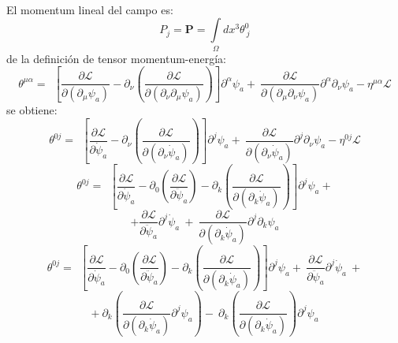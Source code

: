 \documentclass[a4paper,12pt]{article}
\begin{document}
\\

El momentum lineal del campo es:
\begin{equation}
P_{j}=\mathbf{P}=\int\limits_{\Omega}dx^{3}\theta^{0}_{\ j}
\end{equation}
de la definición de tensor momentum-energía:
\begin{equation}
\theta^{\mu\alpha}= \ \ \left[\frac{\partial \mathscr{L} }{\partial(\partial_{\mu} \psi_a)}-\partial_{\nu}\left(\frac{\partial\mathscr{L} }{\partial(\partial_{\nu}\partial_{\mu} \psi_a)}  \right) \right]\partial^\alpha\psi_a +\ \frac{\partial\mathscr{L} }{\partial(\partial_{\mu}\partial_{\nu} \psi_a)}\partial^\alpha\partial_\nu\psi_a-\eta^{\mu\alpha}\mathscr{L}
\end{equation}
se obtiene:
\begin{equation}
\theta^{0j}= \ \ \left[\frac{\partial \mathscr{L} }{\partial\dot\psi_a}-\partial_{\nu}\left(\frac{\partial\mathscr{L} }{\partial(\partial_{\nu}\dot\psi_a)}  \right) \right]\partial^j\psi_a +\ \frac{\partial\mathscr{L} }{\partial(\partial_{\nu} \dot\psi_a)}\partial^j\partial_\nu\psi_a-\eta^{0j}\mathscr{L}
\end{equation}
\begin{equation}
\theta^{0j}= \ \ \left[\frac{\partial \mathscr{L} }{\partial\dot\psi_a}-\partial_{0}\left(\frac{\partial\mathscr{L} }{\partial\ddot\psi_a}  \right)-\partial_{k}\left(\frac{\partial\mathscr{L} }{\partial(\partial_{k}\dot\psi_a)}  \right) \right]\partial^j\psi_a +
\end{equation}
$$+ \frac{\partial\mathscr{L} }{\partial\ddot\psi_a}\partial^j\dot\psi_a\ +\ \frac{\partial\mathscr{L} }{\partial(\partial_k\dot\psi_a)}\partial^j\partial_k\psi_a$$
\begin{equation}
\theta^{0j}= \ \ \left[\frac{\partial \mathscr{L} }{\partial\dot\psi_a}-\partial_{0}\left(\frac{\partial\mathscr{L} }{\partial\ddot\psi_a}  \right)-\partial_{k}\left(\frac{\partial\mathscr{L} }{\partial(\partial_{k}\dot\psi_a)}  \right) \right]\partial^j\psi_a +\ \frac{\partial\mathscr{L} }{\partial\ddot\psi_a}\partial^j\dot\psi_a\ +
\end{equation}
$$+\ \partial_k\left(\frac{\partial\mathscr{L} }{\partial(\partial_k\dot\psi_a)}\partial^j\psi_a\right)-\ \partial_k\left(\frac{\partial\mathscr{L} }{\partial(\partial_k\dot\psi_a)}\right)\partial^j\psi_a$$
\end{document}
